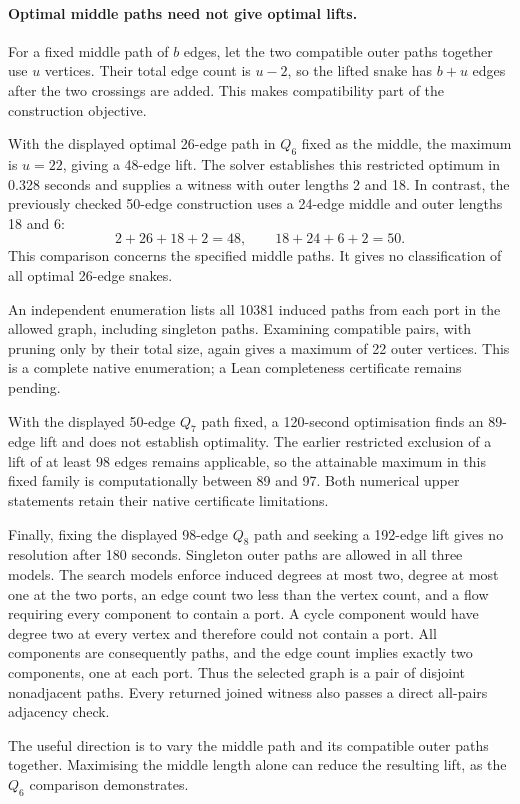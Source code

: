 \documentclass[11pt,a4paper]{article}
\theoremstyle{definition}
\theoremstyle{remark}
\begin{document}
\paragraph{Optimal middle paths need not give optimal lifts.}
For a fixed middle path of $b$ edges, let the two compatible outer
paths together use $u$ vertices. Their total edge count is $u-2$, so
the lifted snake has $b+u$ edges after the two crossings are added.
This makes compatibility part of the construction objective.

With the displayed optimal 26-edge path in $Q_6$ fixed as the middle,
the maximum is $u=22$, giving a 48-edge lift. The solver establishes
this restricted optimum in 0.328 seconds and supplies a witness with
outer lengths 2 and 18. In contrast, the previously checked 50-edge
construction uses a 24-edge middle and outer lengths 18 and 6:
\[
2+26+18+2=48,\qquad 18+24+6+2=50.
\]
This comparison concerns the specified middle paths. It gives no
classification of all optimal 26-edge snakes.

An independent enumeration lists all 10381 induced paths from each port
in the allowed graph, including singleton paths. Examining compatible
pairs, with pruning only by their total size, again gives a maximum
of 22 outer vertices. This is a complete native enumeration; a Lean
completeness certificate remains pending.

With the displayed 50-edge $Q_7$ path fixed, a 120-second optimisation
finds an 89-edge lift and does not establish optimality. The earlier
restricted exclusion of a lift of at least 98 edges remains applicable,
so the attainable maximum in this fixed family is computationally
between 89 and 97. Both numerical upper statements retain their native
certificate limitations.

Finally, fixing the displayed 98-edge $Q_8$ path and seeking a
192-edge lift gives no resolution after 180 seconds. Singleton outer
paths are allowed in all three models. The search models enforce
induced degrees at most two, degree at most one at the two ports,
an edge count two less than the vertex count, and a flow requiring
every component to contain a port. A cycle component would have degree
two at every vertex and therefore could not contain a port. All
components are consequently paths, and the edge count implies exactly
two components, one at each port. Thus the selected graph is a pair
of disjoint nonadjacent paths. Every returned
joined witness also passes a direct all-pairs adjacency check.

The useful direction is to vary the middle path and its compatible
outer paths together. Maximising the middle length alone can reduce
the resulting lift, as the $Q_6$ comparison demonstrates.
\end{document}

